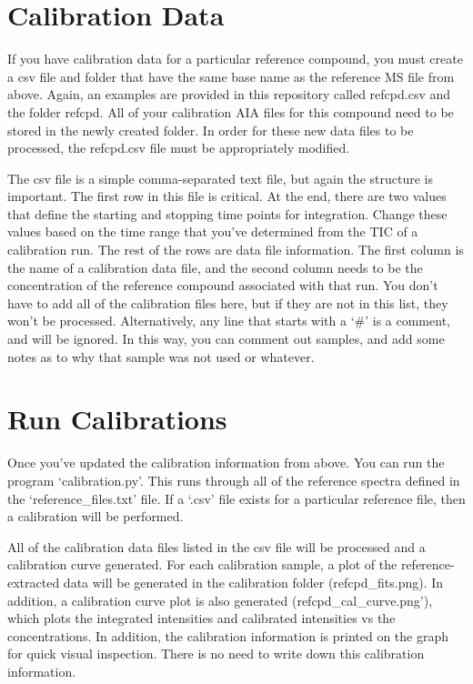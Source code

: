 \documentclass[letterpaper,10pt,english]{sphinxmanual}
\begin{document}
\section{Calibration Data}
\label{calibration:calibration-data}
If you have calibration data for a particular reference compound, you must
create a csv file and folder that have the same base name as the reference MS
file from above. Again, an examples are provided in this repository called
refcpd.csv and the folder refcpd. All of your calibration AIA files for this
compound need to be stored in the newly created folder. In order for these new
data files to be processed, the refcpd.csv file must be appropriately
modified.

The csv file is a simple comma-separated text file, but again the structure is
important. The first row in this file is critical. At the end, there are two
values that define the starting and stopping time points for integration.
Change these values based on the time range that you've determined from the
TIC of a calibration run. The rest of the rows are data file information.  The
first column is the name of a calibration data file, and the second column
needs to be the concentration of the reference compound associated with that
run. You don't have to add all of the calibration files here, but if they are
not in this list, they won't be processed.  Alternatively, any line that
starts with a `\#' is a comment, and will be ignored. In this way, you can
comment out samples, and add some notes as to why that sample was not used or
whatever.


\section{Run Calibrations}
\label{calibration:run-calibrations}
Once you've updated the calibration information from above. You can run the
program `calibration.py'. This runs through all of the reference spectra
defined in the `reference\_files.txt' file. If a `.csv' file exists for a
particular reference file, then a calibration will be performed.

All of the calibration data files listed in the csv file  will be processed
and a calibration curve generated. For each calibration sample, a plot of the
reference-extracted data will be generated in the calibration folder
(refcpd\_fits.png). In addition, a calibration curve plot is also generated
(refcpd\_cal\_curve.png'), which plots the integrated intensities and
calibrated intensities vs the concentrations. In addition, the calibration
information is printed on the graph for quick visual inspection. There is no
need to write down this calibration information.
\end{document}
